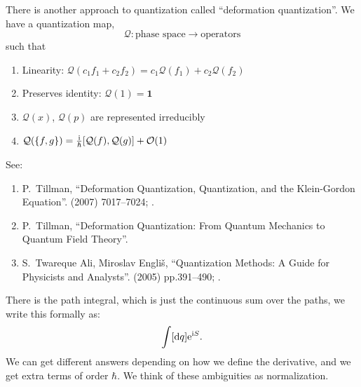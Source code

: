 There is another approach to quantization called ``deformation
quantization''. We have a quantization map,
\begin{equation}
\mathcal{Q}\colon\mbox{phase space}\to\mbox{operators}
\end{equation}
such that
\begin{enumerate}[nosep,label=(\arabic*)]
\item Linearity: $\mathcal{Q}(c_{1}f_{1}+c_{2}f_{2}) = c_{1}\mathcal{Q}(f_{1}) + c_{2}\mathcal{Q}(f_{2})$
\item Preserves identity: $\mathcal{Q}(1)=\mathbf{1}$
\item $\mathcal{Q}(x)$, $\mathcal{Q}(p)$ are represented irreducibly
\item $\mathcal{Q}(\{f,g\}) = \frac{\mathrm{i}}{\hbar}[\mathcal{Q}(f),\mathcal{Q}(g)] + \mathcal{O}(1)$
\end{enumerate}\medbreak\noindent%
See:
\begin{enumerate}[nosep,label=(\arabic*)]
\item P.~Tillman, ``Deformation Quantization, Quantization, and the
Klein-Gordon Equation''.
  (2007) 7017--7024; .\\
{\tt{}}
\item P.~Tillman, ``Deformation Quantization: From Quantum Mechanics to
Quantum Field Theory''. 
\item S.~Twareque Ali, Miroslav Engli\v{s},
``Quantization Methods: A Guide for Physicists and Analysts''.
  (2005) pp.391--490;
.\\
{\tt{}}
\end{enumerate}\medbreak

There is the path integral, which is just the continuous sum over the
paths, we write this formally as:
\begin{equation}
\int[\mathrm{d} q]\mathrm{e}^{\mathrm{i} S}.
\end{equation}
We can get different answers depending on how we define the derivative,
and we get extra terms of order $\hbar$. We think of these ambiguities
as normalization.
